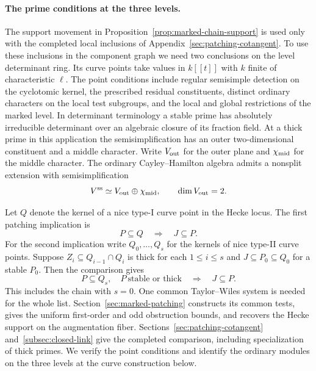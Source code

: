 \paragraph{The prime conditions at the three levels.}
The support movement in Proposition~\ref{prop:marked-chain-support}
is used only with the completed local inclusions of
Appendix~\ref{sec:patching-cotangent}. To use these inclusions in the component graph we need two conclusions on the level
determinant ring. Its curve points take
values in \(k[[t]]\) with \(k\) finite of characteristic \(\ell\).
The point conditions include regular semisimple detection on the
cyclotomic kernel, the prescribed residual constituents, distinct
ordinary characters on the local test subgroups, and the local and
global restrictions of the marked level. In determinant terminology
a stable prime has absolutely irreducible determinant over an
algebraic closure of its fraction field. At a thick prime in this
application the semisimplification has an outer two-dimensional
constituent and a middle character. Write \(V_{\rm out}\) for the outer plane and \(\chi_{\rm mid}\) for the middle character. The ordinary Cayley--Hamilton algebra admits a nonsplit extension with semisimplification 
\[
 V^{\rm ss}\simeq V_{\rm out}\oplus\chi_{\rm mid},\qquad \dim V_{\rm out}=2.
\]

Let \(Q\) denote the kernel of a nice type-I curve point
in the Hecke locus. The first patching implication is
\begin{equation}\label{eq:ordinary-component-stable-test}
              P\subseteq Q\quad\Longrightarrow\quad J\subseteq P .
\end{equation}
For the second implication write \(Q_0,\ldots,Q_s\) for
the kernels of nice type-II curve points. Suppose
\(Z_i\subseteq Q_{i-1}\cap Q_i\) is thick for each
\(1\le i\le s\) and \(J\subseteq P_0\subseteq Q_0\) for
a stable \(P_0\). Then the comparison gives
\begin{equation}\label{eq:ordinary-component-thick-test}
 P\subseteq Q_s,\quad P\ \text{stable or thick}
                  \quad\Longrightarrow\quad J\subseteq P .
\end{equation}
This includes the chain with \(s=0\).
One common Taylor--Wiles system is needed for the whole list.
Section~\ref{sec:marked-patching} constructs its common tests,
gives the uniform first-order and odd obstruction bounds, and
recovers the Hecke support on the augmentation fiber. Sections~\ref{sec:patching-cotangent}
and~\ref{subsec:closed-link} give the completed comparison, including
specialization of thick primes. We verify the point conditions and
identify the ordinary modules on the three levels at the curve
construction below.

